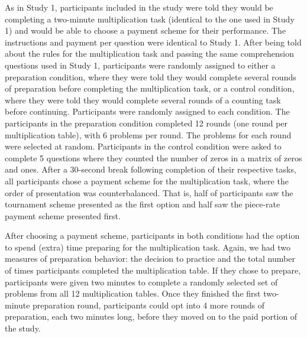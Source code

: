 \documentclass[a4paper, nobind]{templates/ociamthesis}
\begin{document}
As in Study 1, participants included in the study were told they would be completing a two-minute multiplication task (identical to the one used in Study 1) and would be able to choose a payment scheme for their performance. The instructions and payment per question were identical to Study 1. After being told about the rules for the multiplication task and passing the same comprehension questions used in Study 1, participants were randomly assigned to either a preparation condition, where they were told they would complete several rounds of preparation before completing the multiplication task, or a control condition, where they were told they would complete several rounds of a counting task before continuing. Participants were randomly assigned to each condition. The participants in the preparation condition completed 12 rounds (one round per multiplication table), with 6 problems per round. The problems for each round were selected at random. Participants in the control condition were asked to complete 5 questions where they counted the number of zeros in a matrix of zeros and ones. After a 30-second break following completion of their respective tasks, all participants chose a payment scheme for the multiplication task, where the order of presentation was counterbalanced. That is, half of participants saw the tournament scheme presented as the first option and half saw the piece-rate payment scheme presented first.

After choosing a payment scheme, participants in both conditions had the option to spend (extra) time preparing for the multiplication task. Again, we had two measures of preparation behavior: the decision to practice and the total number of times participants completed the multiplication table. If they chose to prepare, participants were given two minutes to complete a randomly selected set of problems from all 12 multiplication tables. Once they finished the first two-minute preparation round, participants could opt into 4 more rounds of preparation, each two minutes long, before they moved on to the paid portion of the study.
\end{document}
